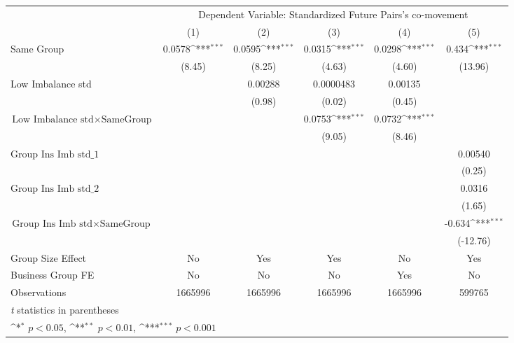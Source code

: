 {
\def\sym#1{\ifmmode^{#1}\else\(^{#1}\)\fi}
\begin{tabular}{l*{5}{c}}
\hline\hline
                &\multicolumn{5}{c}{Dependent Variable: Standardized Future Pairs's co-movement}               \\\cmidrule(lr){2-6}
                &\multicolumn{1}{c}{(1)}         &\multicolumn{1}{c}{(2)}         &\multicolumn{1}{c}{(3)}         &\multicolumn{1}{c}{(4)}         &\multicolumn{1}{c}{(5)}         \\
\hline
Same Group      &   0.0578\sym{***}&   0.0595\sym{***}&   0.0315\sym{***}&   0.0298\sym{***}&    0.434\sym{***}\\
                &   (8.45)         &   (8.25)         &   (4.63)         &   (4.60)         &  (13.96)         \\
[1em]
Low Imbalance std&                  &  0.00288         &0.0000483         &  0.00135         &                  \\
                &                  &   (0.98)         &   (0.02)         &   (0.45)         &                  \\
[1em]
 $ \text{Low Imbalance std} \times {\text{SameGroup} } $ &                  &                  &   0.0753\sym{***}&   0.0732\sym{***}&                  \\
                &                  &                  &   (9.05)         &   (8.46)         &                  \\
[1em]
 $ {\text{Group Ins Imb std}\_1} $ &                  &                  &                  &                  &  0.00540         \\
                &                  &                  &                  &                  &   (0.25)         \\
[1em]
 $ {\text{Group Ins Imb std}\_2} $ &                  &                  &                  &                  &   0.0316         \\
                &                  &                  &                  &                  &   (1.65)         \\
[1em]
$ {\text{Group Ins Imb std} } \times {\text{SameGroup} }  $ &                  &                  &                  &                  &   -0.634\sym{***}\\
                &                  &                  &                  &                  & (-12.76)         \\
\hline
Group Size Effect&       No         &      Yes         &      Yes         &       No         &      Yes         \\
Business Group FE&       No         &       No         &       No         &      Yes         &       No         \\
Observations    &  1665996         &  1665996         &  1665996         &  1665996         &   599765         \\
\hline\hline
\multicolumn{6}{l}{\footnotesize \textit{t} statistics in parentheses}\\
\multicolumn{6}{l}{\footnotesize \sym{*} \(p<0.05\), \sym{**} \(p<0.01\), \sym{***} \(p<0.001\)}\\
\end{tabular}
}
